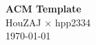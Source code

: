 \documentclass[12pt,a4paper]{article}
\begin{document}
\begin{titlepage}
\begin{center}

\vspace*{6.5cm}

\textbf{\Huge{ACM Template}} \\ [1.5cm]

\large{HouZAJ × hpp2334} \\ [0.2cm]
\today
\end{center}
\clearpage

\tableofcontents
\pagestyle{empty}
\clearpage
\end{titlepage}


\end{document}
